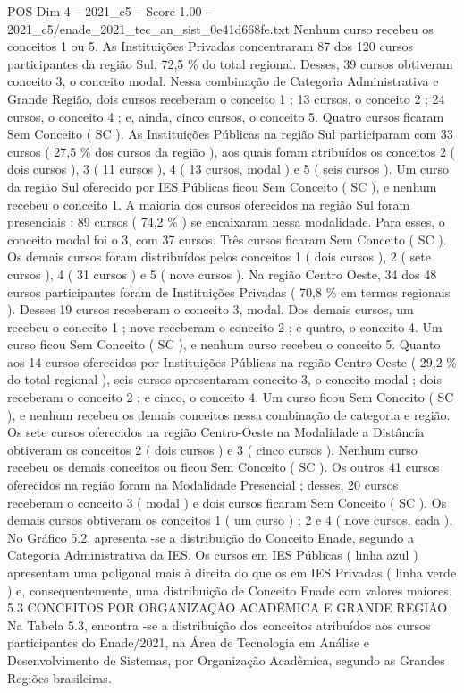 \begin{textsample}{POS Dim 4 – 2021\_c5 – Score 1.00 – 2021\_c5/enade\_2021\_tec\_an\_sist\_0e41d668fe.txt}
Nenhum curso recebeu os conceitos 1 ou 5.
As Instituições Privadas concentraram 87 dos 120 cursos participantes da região Sul, 72,5 \% do total regional.
Desses, 39 cursos obtiveram conceito 3, o conceito modal.
Nessa combinação de Categoria Administrativa e Grande Região, dois cursos receberam o conceito 1 ; 13 cursos, o conceito 2 ; 24 cursos, o conceito 4 ; e, ainda, cinco cursos, o conceito 5.
Quatro cursos ficaram Sem Conceito ( SC ).
As Instituições Públicas na região Sul participaram com 33 cursos ( 27,5 \% dos cursos da região ), aos quais foram atribuídos os conceitos 2 ( dois cursos ), 3 ( 11 cursos ), 4 ( 13 cursos, modal ) e 5 ( seis cursos ).
Um curso da região Sul oferecido por IES Públicas ficou Sem Conceito ( SC ), e nenhum recebeu o conceito 1.
A maioria dos cursos oferecidos na região Sul foram presenciais : 89 cursos ( 74,2 \% ) se encaixaram nessa modalidade.
Para esses, o conceito modal foi o 3, com 37 cursos.
Três cursos ficaram Sem Conceito ( SC ).
Os demais cursos foram distribuídos pelos conceitos 1 ( dois cursos ), 2 ( sete cursos ), 4 ( 31 cursos ) e 5 ( nove cursos ).
Na região Centro Oeste, 34 dos 48 cursos participantes foram de Instituições Privadas ( 70,8 \% em termos regionais ).
Desses 19 cursos receberam o conceito 3, modal.
Dos demais cursos, um recebeu o conceito 1 ; nove receberam o conceito 2 ; e quatro, o conceito 4.
Um curso ficou Sem Conceito ( SC ), e nenhum curso recebeu o conceito 5.
Quanto aos 14 cursos oferecidos por Instituições Públicas na região Centro Oeste ( 29,2 \% do total regional ), seis cursos apresentaram conceito 3, o conceito modal ; dois receberam o conceito 2 ; e cinco, o conceito 4.
Um curso ficou Sem Conceito ( SC ), e nenhum recebeu os demais conceitos nessa combinação de categoria e região.
Os sete cursos oferecidos na região Centro-Oeste na Modalidade a Distância obtiveram os conceitos 2 ( dois cursos ) e 3 ( cinco cursos ).
Nenhum curso recebeu os demais conceitos ou ficou Sem Conceito ( SC ).
Os outros 41 cursos oferecidos na região foram na Modalidade Presencial ; desses, 20 cursos receberam o conceito 3 ( modal ) e dois cursos ficaram Sem Conceito ( SC ).
Os demais cursos obtiveram os conceitos 1 ( um curso ) ; 2 e 4 ( nove cursos, cada ).
No Gráfico 5.2, apresenta -se a distribuição do Conceito Enade, segundo a Categoria Administrativa da IES.
Os cursos em IES Públicas ( linha azul ) apresentam uma poligonal mais à direita do que os em IES Privadas ( linha verde ) e, consequentemente, uma distribuição de Conceito Enade com valores maiores. 5.3 CONCEITOS POR ORGANIZAÇÃO ACADÊMICA E GRANDE REGIÃO Na Tabela 5.3, encontra -se a distribuição dos conceitos atribuídos aos cursos participantes do Enade/2021, na Área de Tecnologia em Análise e Desenvolvimento de Sistemas, por Organização Acadêmica, segundo as Grandes Regiões brasileiras.

\end{textsample}
